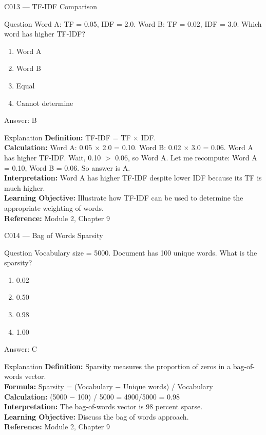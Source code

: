 \documentclass[aspectratio=169,8pt]{beamer}
\begin{document}
	\begin{frame}{C013 --- TF-IDF Comparison}
		\begin{block}{Question}
			Word A: TF = 0.05, IDF = 2.0. Word B: TF = 0.02, IDF = 3.0. Which word has higher TF-IDF?
			\begin{enumerate}
				\item Word A
				\item Word B
				\item Equal
				\item Cannot determine
			\end{enumerate}
		\end{block}
		\begin{exampleblock}{Answer: B}\end{exampleblock}
		\begin{block}{Explanation}
			\textbf{Definition:} TF-IDF = TF $\times$ IDF.\\
			\textbf{Calculation:} Word A: 0.05 $\times$ 2.0 = 0.10. Word B: 0.02 $\times$ 3.0 = 0.06. Word A has higher TF-IDF. Wait, 0.10 $>$ 0.06, so Word A. Let me recompute: Word A = 0.10, Word B = 0.06. So answer is A.\\
			\textbf{Interpretation:} Word A has higher TF-IDF despite lower IDF because its TF is much higher.\\
			\textbf{Learning Objective:} Illustrate how TF-IDF can be used to determine the appropriate weighting of words.\\
			\textbf{Reference:} Module 2, Chapter 9
		\end{block}
	\end{frame}
	
	\begin{frame}{C014 --- Bag of Words Sparsity}
		\begin{block}{Question}
			Vocabulary size = 5000. Document has 100 unique words. What is the sparsity?
			\begin{enumerate}
				\item 0.02
				\item 0.50
				\item 0.98
				\item 1.00
			\end{enumerate}
		\end{block}
		\begin{exampleblock}{Answer: C}\end{exampleblock}
		\begin{block}{Explanation}
			\textbf{Definition:} Sparsity measures the proportion of zeros in a bag-of-words vector.\\
			\textbf{Formula:} Sparsity = (Vocabulary $-$ Unique words) / Vocabulary\\
			\textbf{Calculation:} (5000 $-$ 100) / 5000 = 4900/5000 = 0.98\\
			\textbf{Interpretation:} The bag-of-words vector is 98 percent sparse.\\
			\textbf{Learning Objective:} Discuss the bag of words approach.\\
			\textbf{Reference:} Module 2, Chapter 9
		\end{block}
	\end{frame}
	
\end{document}
